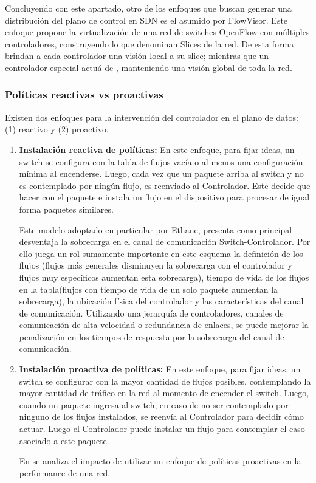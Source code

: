 Concluyendo con este apartado, otro de los enfoques que buscan generar una distribución del plano de control en SDN es el asumido por FlowVisor\cite{sherwood2010carving}. Este enfoque propone la virtualización de una red de switches OpenFlow con múltiples controladores, construyendo lo que denominan Slices de la red. De esta forma brindan a cada controlador una visión local a su slice; mientras que un controlador especial actuá de , manteniendo una visión global de toda la red.

\subsubsection{Políticas reactivas vs proactivas}
Existen dos enfoques para la intervención del controlador en el plano de datos: (1) reactivo y (2) proactivo.

\begin{enumerate}
\item \textbf{Instalación reactiva de políticas:} En este enfoque, para fijar ideas, un switch se configura con la tabla de flujos vac\'ia o al menos una configuración mínima al encenderse. Luego, cada vez que un paquete arriba al switch y no es contemplado por ning\'un flujo, es reenviado al Controlador. Este decide que hacer con el paquete e instala un flujo en el dispositivo para procesar de igual forma paquetes similares.

Este modelo adoptado en particular por Ethane\cite{casado2007ethane}, presenta como principal desventaja la sobrecarga en el canal de comunicación Switch-Controlador. Por ello juega un rol sumamente importante en este esquema la definición de los flujos (flujos m\'as generales disminuyen la sobrecarga con el controlador y flujos muy específicos aumentan esta sobrecarga), tiempo de vida de los flujos en la tabla(flujos con tiempo de vida de un solo paquete aumentan la sobrecarga), la ubicación física del controlador y las características del canal de comunicación. Utilizando una jerarquía de controladores, canales de comunicación de alta velocidad o redundancia de enlaces, se puede mejorar la penalizaci\'on en los tiempos de respuesta por la sobrecarga del canal de comunicación. 

\item \textbf{Instalación proactiva de políticas:} En este enfoque, para fijar ideas, un switch se configurar con la mayor cantidad de flujos posibles, contemplando la mayor cantidad de tr\'afico en la red al momento de encender el switch. Luego, cuando un paquete ingresa al switch, en caso de no ser contemplado por ninguno de los flujos instalados, se reenvía al Controlador para decidir c\'omo actuar. Luego el Controlador puede instalar un flujo para contemplar el caso asociado a este paquete. 

En \cite{yu2011scalable} se analiza el impacto de utilizar un enfoque de políticas proactivas en la performance de una red.  

\end{enumerate} 

